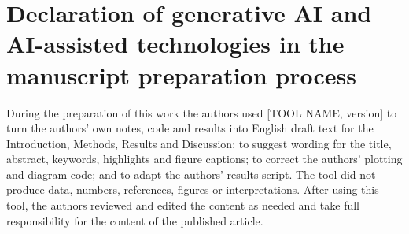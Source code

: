 \documentclass[preprint,12pt]{elsarticle}   %
\begin{document}
\section*{Declaration of generative AI and AI-assisted technologies in the manuscript preparation process}
During the preparation of this work the authors used [TOOL NAME, version] to turn the authors'
own notes, code and results into English draft text for the Introduction, Methods, Results and
Discussion; to suggest wording for the title, abstract, keywords, highlights and figure captions;
to correct the authors' plotting and diagram code; and to adapt the authors' results script. The
tool did not produce data, numbers, references, figures or interpretations. After using this
tool, the authors reviewed and edited the content as needed and take full responsibility for the
content of the published article.



\end{document}
